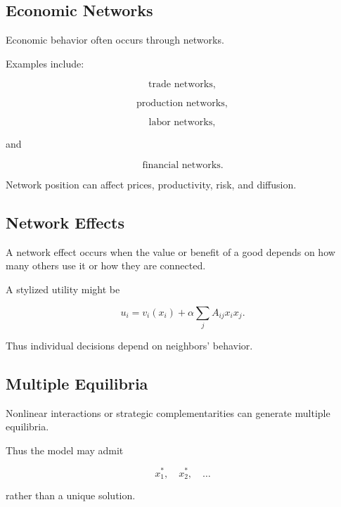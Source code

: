 \subsection{Economic Networks}
\label{subsec:economic-networks}

Economic behavior often occurs through networks.

Examples include:

\[
\boxed{
\text{trade networks},
}
\]

\[
\boxed{
\text{production networks},
}
\]

\[
\boxed{
\text{labor networks},
}
\]

and

\[
\boxed{
\text{financial networks}.
}
\]

Network position can affect prices, productivity, risk, and diffusion.

\subsection{Network Effects}
\label{subsec:network-effects-economics}

A network effect occurs when the value or benefit of a good depends on how
many others use it or how they are connected.

A stylized utility might be

\[
\boxed{
u_i
=
v_i(x_i)
+
\alpha
\sum_jA_{ij}x_ix_j.
}
\]

Thus individual decisions depend on neighbors' behavior.

\subsection{Multiple Equilibria}
\label{subsec:multiple-equilibria-economics}

Nonlinear interactions or strategic complementarities can generate multiple
equilibria.

Thus the model may admit

\[
\boxed{
x_1^*,
\quad
x_2^*,
\quad
\ldots
}
\]

rather than a unique solution.

